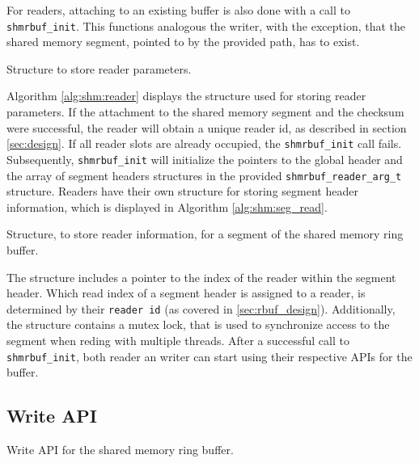 \par
For readers, attaching to an existing buffer is also done with a call to \texttt{shmrbuf\_init}. This functions analogous the writer, with the exception, that the
shared memory segment, pointed to by the provided path, has to exist. 
\begin{algorithm}[h!]
    
    \caption[Shared Memory Ringbuffer: Reader Parameters]{Structure to store reader parameters.}
    \label{alg:shm:reader_arg}
\end{algorithm}
Algorithm \ref{alg:shm:reader} displays the structure used for storing reader parameters. If the attachment to the shared memory segment
and the checksum were successful, the reader will obtain a unique reader id, as described in section \ref{sec:design}. If all reader slots are already occupied, the \texttt{shmrbuf\_init} call fails.
Subsequently, \texttt{shmrbuf\_init} will initialize the pointers to the global header and the array of segment headers structures in the provided \texttt{shmrbuf\_reader\_arg\_t} structure.  
Readers have their own structure for storing segment header information, which is displayed in Algorithm \ref{alg:shm:seg_read}.  
\begin{algorithm}[h!]
    
    \label{alg:shm:seg_read}
    \caption[Shared Memory Ringbuffer: Reader Segment Header]{Structure, to store reader information, for a segment of the shared memory ring buffer.}
\end{algorithm}

The structure includes a pointer to the index of the reader within the segment header. Which read index of a segment header is assigned to a reader, is determined 
by their \texttt{reader id} (as covered in \ref{sec:rbuf_design}). Additionally, the structure contains a mutex lock, that is used to synchronize access to the segment when reding with multiple threads.
After a successful call to \texttt{shmrbuf\_init}, both reader an writer can start using their respective APIs for the buffer.

\subsection{Write API}

\begin{algorithm}[h!]
    
    \caption[Shared Memory Ringbuffer: Write API]{Write API for the shared memory ring buffer.}
    \label{alg:shm:write_api}
\end{algorithm}

